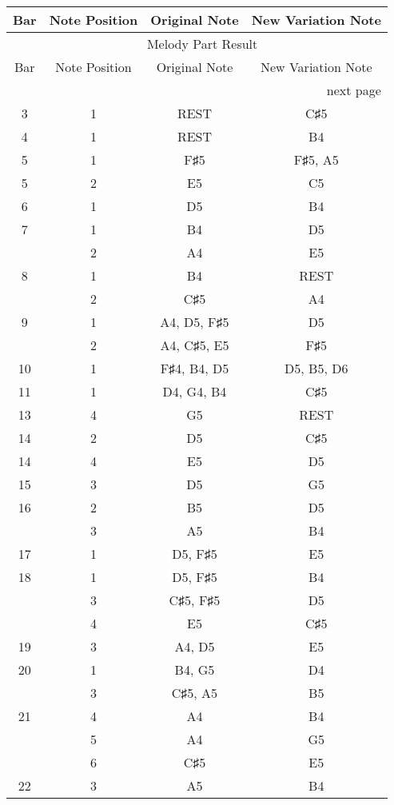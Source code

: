 \documentclass{article}
\begin{document}
\begin{longtable}{|c|c|c|c|}
\hline
Bar & Note Position & Original Note & New Variation Note \\ \hline
\endfirsthead
\multicolumn{4}{c}{{\tablename\ \thetable{} Melody Part Result}} \\
\hline
Bar & Note Position & Original Note & New Variation Note \\ \hline
\hline
\endhead
\hline
\multicolumn{4}{r}{next page}\endfoot
\hline
\endlastfoot
1 & 1 & REST & F♯5 \\ 
\hline
3 & 1 & REST & C♯5 \\ 
\hline
4 & 1 & REST & B4 \\ 
\hline
5 & 1 & F♯5 & F♯5, A5 \\ 
\hline
5 & 2 & E5 & C5 \\ 
\hline
6 & 1 & D5 & B4 \\ 
\hline
7 & 1 & B4 & D5 \\ 
  & 2 & A4 & E5 \\ 
\hline
8 & 1 & B4 & REST \\ 
  & 2 & C♯5 & A4 \\ 
\hline
9 & 1 & A4, D5, F♯5 & D5 \\ 
  & 2 & A4, C♯5, E5 & F♯5 \\ 
\hline
10 & 1 & F♯4, B4, D5 & D5, B5, D6 \\ 
\hline
11 & 1 & D4, G4, B4 & C♯5 \\ 
\hline
13 & 4 & G5 & REST \\ 
\hline
14 & 2 & D5 & C♯5 \\ 
\hline
14 & 4 & E5 & D5 \\ 
\hline
15 & 3 & D5 & G5 \\ 
\hline
16 & 2 & B5 & D5 \\ 
  & 3 & A5 & B4 \\ 
\hline
17 & 1 & D5, F♯5 & E5 \\ 
\hline
18 & 1 & D5, F♯5 & B4 \\ 
  & 3 & C♯5, F♯5 & D5 \\ 
  & 4 & E5 & C♯5 \\ 
\hline
19 & 3 & A4, D5 & E5 \\ 
\hline
20 & 1 & B4, G5 & D4 \\ 
  & 3 & C♯5, A5 & B5 \\ 
\hline
21 & 4 & A4 & B4 \\ 
  & 5 & A4 & G5 \\ 
  & 6 & C♯5 & E5 \\ 
\hline
22 & 3 & A5 & B4 \\ 

\end{longtable}
\end{document}
